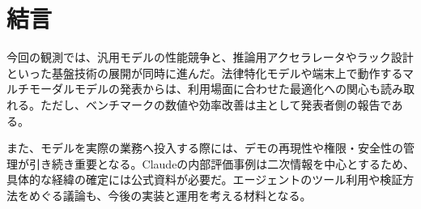 \section*{結言}
今回の観測では、汎用モデルの性能競争と、推論用アクセラレータやラック設計といった基盤技術の展開が同時に進んだ。法律特化モデルや端末上で動作するマルチモーダルモデルの発表からは、利用場面に合わせた最適化への関心も読み取れる。ただし、ベンチマークの数値や効率改善は主として発表者側の報告である。

また、モデルを実際の業務へ投入する際には、デモの再現性や権限・安全性の管理が引き続き重要となる。Claudeの内部評価事例は二次情報を中心とするため、具体的な経緯の確定には公式資料が必要だ。エージェントのツール利用や検証方法をめぐる議論も、今後の実装と運用を考える材料となる。
